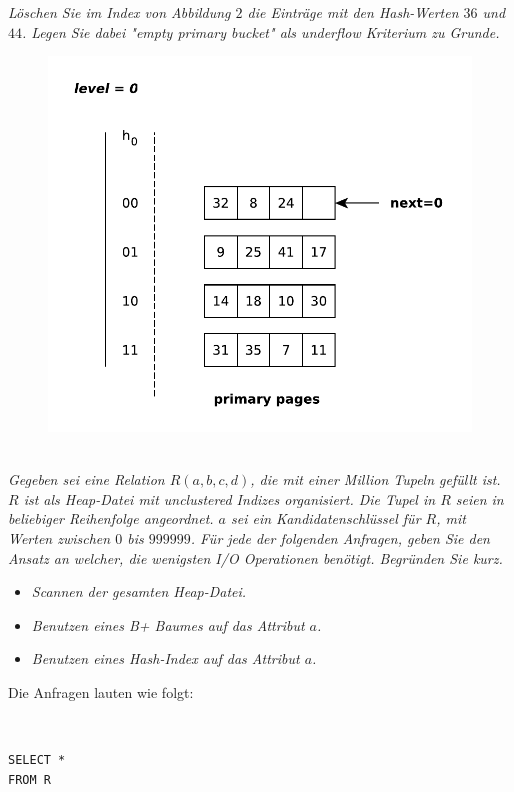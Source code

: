 \documentclass{uni_tue_template}
\begin{document}
  \newpage
  \item \emph{Löschen Sie im Index von Abbildung $2$ die Einträge mit den Hash-Werten $36$ und $44$. Legen Sie dabei "empty primary bucket" als \emph{underflow} Kriterium zu Grunde.}
  \begin{figure}[h!]
    \centering
    \includegraphics[scale=0.7]{graphml/02_4.pdf}
  \end{figure}
  \newpage
\subExEnd{}
%
\newpage 
%
\exercise{}\\
\emph{Gegeben sei eine Relation $R(a, b, c, d)$, die mit einer Million Tupeln gefüllt ist. $R$ ist als Heap-Datei mit unclustered Indizes organisiert. Die Tupel in $R$ seien in beliebiger Reihenfolge angeordnet. $a$ sei ein Kandidatenschlüssel für $R$, mit Werten zwischen $0$ bis $999999$. Für jede der folgenden Anfragen, geben Sie den Ansatz an welcher, die wenigsten I/O Operationen benötigt. Begründen Sie \emph{kurz}.}
\begin{itemize}
  \item \emph{Scannen der gesamten Heap-Datei.}
  \item \emph{Benutzen eines B+ Baumes auf das Attribut $a$.}
  \item \emph{Benutzen eines Hash-Index auf das Attribut $a$.}
\end{itemize}
Die Anfragen lauten wie folgt:
  \item \hfill\\
\begin{lstlisting}
SELECT *
FROM R
\end{lstlisting}
\end{document}
